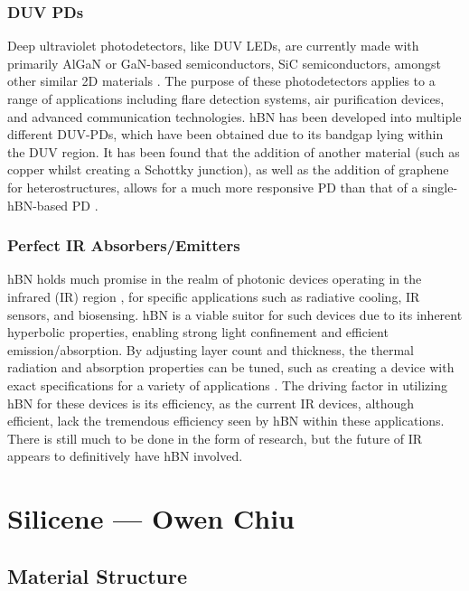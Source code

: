 \documentclass[conference]{IEEEtran}
\begin{document}
  \subsubsection{DUV PDs}

  Deep ultraviolet photodetectors, like DUV LEDs, are currently made with primarily AlGaN or GaN-based semiconductors, SiC semiconductors, amongst other similar 2D materials \cite{jb1}. The purpose of these photodetectors applies to a range of applications including flare detection systems, air purification devices, and advanced communication technologies. hBN has been developed into multiple different DUV-PDs, which have been obtained due to its bandgap lying within the DUV region. It has been found that the addition of another material (such as copper whilst creating a Schottky junction), as well as the addition of graphene for heterostructures, allows for a much more responsive PD than that of a single-hBN-based PD \cite{jb1}.

  \subsubsection{Perfect IR Absorbers/Emitters}

  hBN holds much promise in the realm of photonic devices operating in the infrared (IR) region \cite{jb2}, for specific applications such as radiative cooling, IR sensors, and biosensing. hBN is a viable suitor for such devices due to its inherent hyperbolic properties, enabling strong light confinement and efficient emission/absorption. By adjusting layer count and thickness, the thermal radiation and absorption properties can be tuned, such as creating a device with exact specifications for a variety of applications \cite{jb1}. The driving factor in utilizing hBN for these devices is its efficiency, as the current IR devices, although efficient, lack the tremendous efficiency seen by hBN within these applications. There is still much to be done in the form of research, but the future of IR appears to definitively have hBN involved.

\section{Silicene — Owen Chiu}

\subsection{Material Structure}
\end{document}
